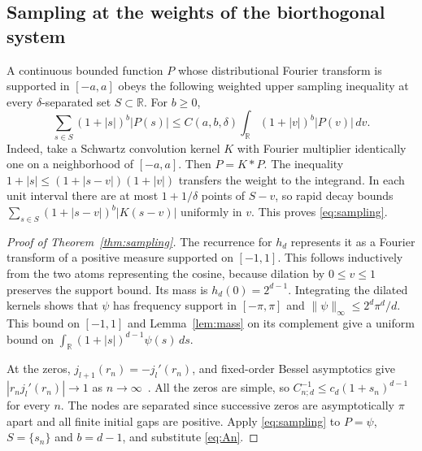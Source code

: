 \documentclass[11pt,a4paper]{article}
\theoremstyle{remark}\newtheorem{remark}[theorem]{Remark}
\numberwithin{equation}{section}
\begin{document}
\subsection{Sampling at the weights of the biorthogonal system}
A continuous bounded function $P$ whose distributional Fourier transform is supported in $[-a,a]$ obeys the following weighted upper sampling inequality at every $\delta$-separated set $S\subset\mathbb R$. For $b\ge0$,
\begin{equation}
  \sum_{s\in S}(1+|s|)^b|P(s)|
  \le C(a,b,\delta)\int_{\mathbb R}(1+|v|)^b|P(v)|\,dv .
  \label{eq:sampling}
\end{equation}
Indeed, take a Schwartz convolution kernel $K$ with Fourier multiplier identically one on a neighborhood of $[-a,a]$. Then $P=K*P$. The inequality $1+|s|\le(1+|s-v|)(1+|v|)$ transfers the weight to the integrand. In each unit interval there are at most $1+1/\delta$ points of $S-v$, so rapid decay bounds $\sum_{s\in S}(1+|s-v|)^b|K(s-v)|$ uniformly in $v$. This proves \eqref{eq:sampling}.

\begin{proof}[Proof of Theorem~\ref{thm:sampling}]
The recurrence for $h_d$ represents it as a Fourier transform of a positive measure supported on $[-1,1]$. This follows inductively from the two atoms representing the cosine, because dilation by $0\le v\le1$ preserves the support bound. Its mass is $h_d(0)=2^{d-1}$. Integrating the dilated kernels shows that $\psi$ has frequency support in $[-\pi,\pi]$ and $\|\psi\|_\infty\le 2^d\pi^d/d$. This bound on $[-1,1]$ and Lemma~\ref{lem:mass} on its complement give a uniform bound on $\int_{\mathbb R}(1+|s|)^{d-1}\psi(s)\,ds$.

At the zeros, $j_{l+1}(r_n)=-j_l'(r_n)$, and fixed-order Bessel asymptotics give $|r_nj_l'(r_n)|\to1$ as $n\to\infty$~\cite[Secs.~10.17, 10.47, 10.51]{BBDLMF}. All the zeros are simple, so $C_{n;d}^{-1}\le c_d(1+s_n)^{d-1}$ for every $n$. The nodes are separated since successive zeros are asymptotically $\pi$ apart and all finite initial gaps are positive. Apply \eqref{eq:sampling} to $P=\psi$, $S=\{s_n\}$ and $b=d-1$, and substitute \eqref{eq:An}.
\end{proof}
\end{document}
